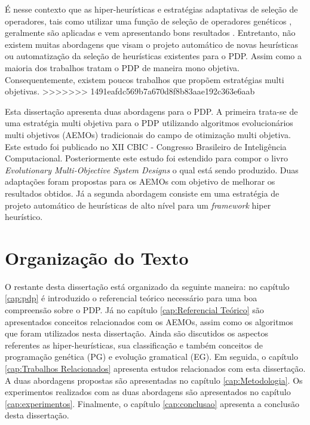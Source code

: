 É nesse contexto que as hiper-heurísticas e estratégias adaptativas de seleção de operadores, tais como utilizar uma função de seleção de operadores genéticos \cite{misir2012intelligent}, geralmente são aplicadas e vem apresentando bons resultados \cite{burke2013hyper}. Entretanto, não existem muitas abordagens que visam o projeto automático de novas heurísticas ou automatização da seleção de heurísticas existentes para o PDP. Assim como a maioria dos trabalhos tratam o PDP de maneira mono objetiva. Consequentemente, existem poucos trabalhos que propõem estratégias multi objetivas.
>>>>>>> 1491eafdc569b7a670d8f8b83aae192c363e6aab

Esta dissertação apresenta duas abordagens para o PDP. A primeira trata-se de uma estratégia multi objetiva para o PDP utilizando algoritmos evolucionários multi objetivos (AEMOs) tradicionais do campo de otimização multi objetiva. Este estudo \cite{fontouralimacbic2015} foi publicado no XII CBIC - Congresso Brasileiro de Inteligência Computacional. Posteriormente este estudo foi estendido para compor o livro \textit{Evolutionary Multi-Objective System Designs} o qual está sendo produzido. Duas adaptações foram propostas para os AEMOs com objetivo de melhorar os resultados obtidos. Já a segunda abordagem consiste em uma estratégia de projeto automático de heurísticas de alto nível para um \textit{framework} hiper heurístico.




\section{Organização do Texto}
\label{Introducao:Organizacao do Texto}

O restante desta dissertação está organizado da seguinte maneira: no capítulo \ref{cap:pdp} é introduzido o referencial teórico necessário para uma boa compreensão sobre o PDP. Já no capítulo \ref{cap:Referencial Teórico} são apresentados conceitos relacionados com os AEMOs, assim como os algoritmos que foram utilizados nesta dissertação. Ainda são discutidos os aspectos referentes as hiper-heurísticas, sua classificação e também conceitos de programação genética (PG) e evolução gramatical (EG). Em seguida, o capítulo \ref{cap:Trabalhos Relacionados} apresenta estudos relacionados com esta dissertação. A duas abordagens propostas são apresentadas no capítulo \ref{cap:Metodologia}. Os experimentos realizados com as duas abordagens são apresentados no capítulo \ref{cap:experimentos}. Finalmente, o capítulo \ref{cap:conclusao} apresenta a conclusão desta dissertação.







 